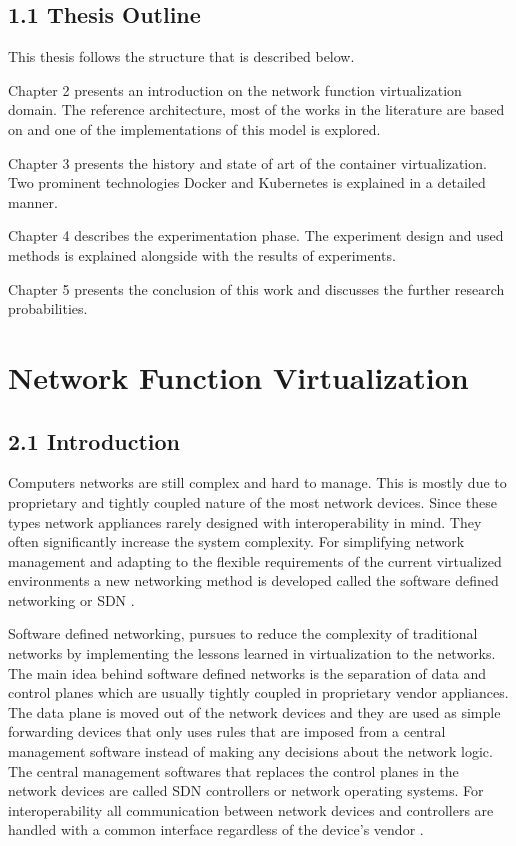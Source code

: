 \documentclass[12pt,oneandhalf,chaparabic,ceng,ms,eng,oneside,pntc]{gsufbe}
\begin{document}
\section[Thesis Outline]{1.1 Thesis Outline}
This thesis follows the structure that is described below.

Chapter 2 presents an introduction on the network function virtualization domain.  The reference
architecture, most of the works in the literature are based on and one of the implementations of this
model is explored.

Chapter 3 presents the history and state of art of the container virtualization.  Two prominent
technologies Docker and Kubernetes is explained in a detailed manner.

Chapter 4 describes the experimentation phase.  The experiment design and used methods is explained
alongside with the results of experiments.

Chapter 5 presents the conclusion of this work and discusses the further research probabilities.


\chapter{Network Function Virtualization}
\section[Introduction]{2.1 Introduction}
Computers networks are still complex and hard to manage.  This is mostly due to proprietary and tightly
coupled nature of the most network devices.  Since these types network appliances rarely designed with
interoperability in mind.  They often significantly increase the system complexity.  For simplifying
network management and adapting to the flexible requirements of the current virtualized environments a
new networking method is developed called the software defined networking or SDN
\cite{chayapathi_network_2016}.

Software defined networking, pursues to reduce the complexity of traditional networks by implementing 
the lessons learned in virtualization to the networks.  The main idea behind software defined networks
is the separation of data and control planes which are usually tightly coupled in proprietary vendor
appliances.  The data plane is moved out of the network devices and they are used as simple forwarding
devices that only uses rules that are imposed from a central management software instead of making any
decisions about the network logic.  The central management softwares that replaces the control planes in
the network devices are called SDN controllers or network operating systems.  For interoperability all
communication between network devices and controllers are handled with a common interface regardless of
the device's vendor \cite{li_software_defined_2015}.
\end{document}
